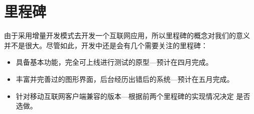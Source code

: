 \section{里程碑}

由于采用增量开发模式去开发一个互联网应用，所以里程碑的概念对我们的意义
并不是很大。尽管如此，开发中还是会有几个需要关注的里程碑：
\begin{itemize}
\item 具备基本功能，完全可上线进行测试的原型---预计在四月完成。
\item 丰富并完善过的图形界面，后台经历出错后的系统---预计在五月完成。
\item 针对移动互联网客户端兼容的版本---根据前两个里程碑的实现情况决定
  是否选做。
\end{itemize}





